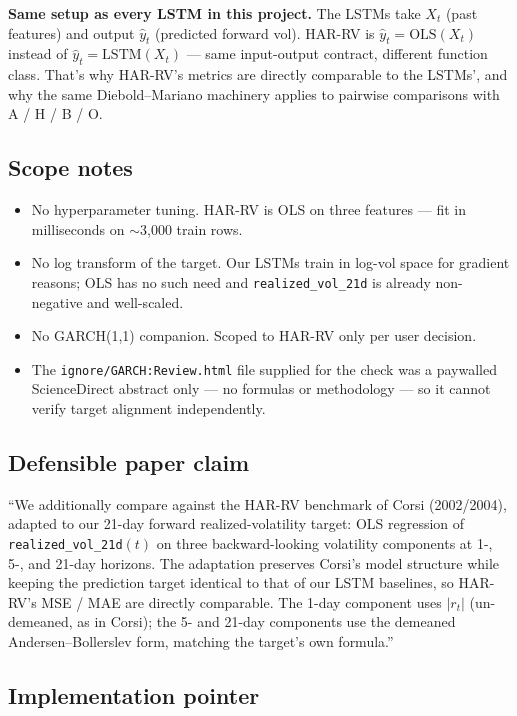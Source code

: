 \documentclass[11pt]{article}
\begin{document}
\textbf{Same setup as every LSTM in this project.} The LSTMs take $X_t$ (past features) and output $\hat y_t$ (predicted forward vol). HAR-RV is $\hat y_t = \mathrm{OLS}(X_t)$ instead of $\hat y_t = \mathrm{LSTM}(X_t)$ --- same input-output contract, different function class. That's why HAR-RV's metrics are directly comparable to the LSTMs', and why the same Diebold--Mariano machinery applies to pairwise comparisons with A / H / B / O.

\subsection*{Scope notes}

\begin{itemize}[leftmargin=*]
  \item No hyperparameter tuning. HAR-RV is OLS on three features --- fit in milliseconds on $\sim$3{,}000 train rows.
  \item No log transform of the target. Our LSTMs train in log-vol space for gradient reasons; OLS has no such need and \texttt{realized\_vol\_21d} is already non-negative and well-scaled.
  \item No GARCH(1,1) companion. Scoped to HAR-RV only per user decision.
  \item The \texttt{ignore/GARCH:Review.html} file supplied for the check was a paywalled ScienceDirect abstract only --- no formulas or methodology --- so it cannot verify target alignment independently.
\end{itemize}

\subsection*{Defensible paper claim}

``We additionally compare against the HAR-RV benchmark of Corsi (2002/2004), adapted to our 21-day forward realized-volatility target: OLS regression of \texttt{realized\_vol\_21d}$(t)$ on three backward-looking volatility components at 1-, 5-, and 21-day horizons. The adaptation preserves Corsi's model structure while keeping the prediction target identical to that of our LSTM baselines, so HAR-RV's MSE / MAE are directly comparable. The 1-day component uses $|r_t|$ (un-demeaned, as in Corsi); the 5- and 21-day components use the demeaned Andersen--Bollerslev form, matching the target's own formula.''

\subsection*{Implementation pointer}
\end{document}
